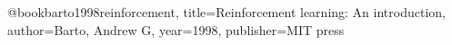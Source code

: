 @book{barto1998reinforcement,
  title={Reinforcement learning: An introduction},
  author={Barto, Andrew G},
  year={1998},
  publisher={MIT press}
}